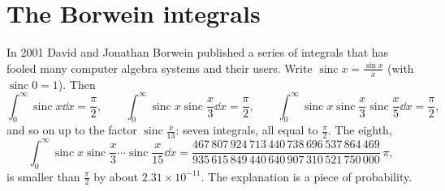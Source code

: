 \section{The Borwein integrals}

In 2001 David and Jonathan Borwein published a series of integrals that has fooled many computer algebra systems and their users. Write
$\operatorname{sinc}x=\frac{\sin x}x$ (with $\operatorname{sinc}0=1$). Then
\[
\int_0^\infty\operatorname{sinc}x\dd x=\frac\pi2,\qquad\int_0^\infty\operatorname{sinc}x\operatorname{sinc}\frac x3\dd x=\frac\pi2,\qquad
\int_0^\infty\operatorname{sinc}x\operatorname{sinc}\frac x3\operatorname{sinc}\frac x5\dd x=\frac\pi2,
\]
and so on up to the factor $\operatorname{sinc}\frac x{13}$: seven integrals, all equal to $\frac\pi2$. The eighth,
\[
\int_0^\infty\operatorname{sinc}x\operatorname{sinc}\frac x3\cdots\operatorname{sinc}\frac x{15}\dd x
=\frac{467\,807\,924\,713\,440\,738\,696\,537\,864\,469}{935\,615\,849\,440\,640\,907\,310\,521\,750\,000}\,\pi,
\]
is smaller than $\frac\pi2$ by about $2.31\times10^{-11}$. The explanation is a piece of probability.

